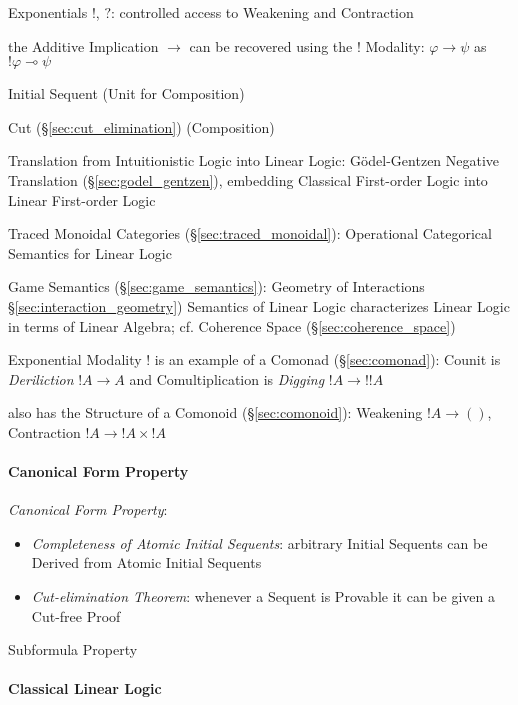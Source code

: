 Exponentials $!$, $?$: controlled access to Weakening and Contraction

the Additive Implication $\rightarrow$ can be recovered using the $!$
Modality: $\varphi \rightarrow \psi$ as $!\varphi \multimap \psi$

Initial Sequent (Unit for Composition)

Cut (\S\ref{sec:cut_elimination}) (Composition)

Translation from Intuitionistic Logic into Linear Logic:
G\"odel-Gentzen Negative Translation (\S\ref{sec:godel_gentzen}),
embedding Classical First-order Logic into Linear First-order Logic

Traced Monoidal Categories (\S\ref{sec:traced_monoidal}): Operational
Categorical Semantics for Linear Logic

Game Semantics (\S\ref{sec:game_semantics}): Geometry of Interactions
\S\ref{sec:interaction_geometry}) Semantics of Linear Logic
characterizes Linear Logic in terms of Linear Algebra; cf. Coherence
Space (\S\ref{sec:coherence_space})

Exponential Modality $!$ is an example of a Comonad
(\S\ref{sec:comonad}): Counit is \emph{Deriliction} $!A \rightarrow A$
and Comultiplication is \emph{Digging} $!A \rightarrow !!A$

also has the Structure of a Comonoid (\S\ref{sec:comonoid}): Weakening
$!A \rightarrow ()$, Contraction $!A \rightarrow !A \times !A$



\paragraph{Canonical Form Property}\label{sec:canonical_form_property}\hfill

\emph{Canonical Form Property}:
\begin{itemize}
  \item \emph{Completeness of Atomic Initial Sequents}: arbitrary
    Initial Sequents can be Derived from Atomic Initial Sequents
  \item \emph{Cut-elimination Theorem}: whenever a Sequent is Provable
    it can be given a Cut-free Proof
\end{itemize}

Subformula Property



\paragraph{Classical Linear Logic}\label{sec:cll} \hfill

